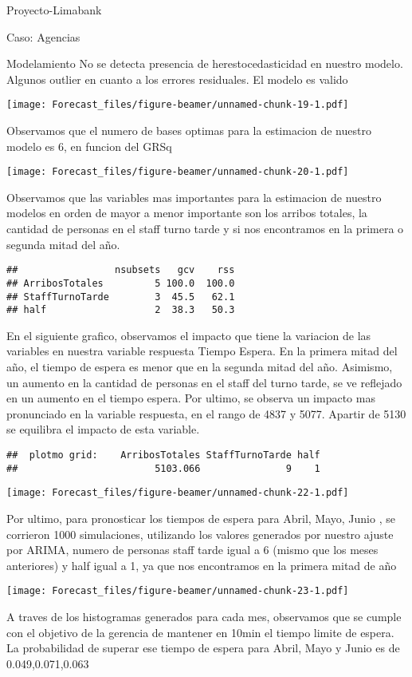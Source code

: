 \documentclass[
  ignorenonframetext,
]{beamer}
\begin{document}
\begin{frame}[fragile]{Proyecto-Limabank}
\begin{block}{Caso: Agencias}
\begin{block}{Modelamiento}
No se detecta presencia de herestocedasticidad en nuestro modelo.
Algunos outlier en cuanto a los errores residuales. El modelo es valido

\texttt{[image: Forecast\_files/figure-beamer/unnamed-chunk-19-1.pdf]}

Observamos que el numero de bases optimas para la estimacion de nuestro
modelo es 6, en funcion del GRSq

\texttt{[image: Forecast\_files/figure-beamer/unnamed-chunk-20-1.pdf]}

Observamos que las variables mas importantes para la estimacion de
nuestro modelos en orden de mayor a menor importante son los arribos
totales, la cantidad de personas en el staff turno tarde y si nos
encontramos en la primera o segunda mitad del año.

\begin{verbatim}
##                 nsubsets   gcv    rss
## ArribosTotales         5 100.0  100.0
## StaffTurnoTarde        3  45.5   62.1
## half                   2  38.3   50.3
\end{verbatim}

En el siguiente grafico, observamos el impacto que tiene la variacion de
las variables en nuestra variable respuesta Tiempo Espera. En la primera
mitad del año, el tiempo de espera es menor que en la segunda mitad del
año. Asimismo, un aumento en la cantidad de personas en el staff del
turno tarde, se ve reflejado en un aumento en el tiempo espera. Por
ultimo, se observa un impacto mas pronunciado en la variable respuesta,
en el rango de 4837 y 5077. Apartir de 5130 se equilibra el impacto de
esta variable.

\begin{verbatim}
##  plotmo grid:    ArribosTotales StaffTurnoTarde half
##                        5103.066               9    1
\end{verbatim}

\texttt{[image: Forecast\_files/figure-beamer/unnamed-chunk-22-1.pdf]}

Por ultimo, para pronosticar los tiempos de espera para Abril, Mayo,
Junio , se corrieron 1000 simulaciones, utilizando los valores generados
por nuestro ajuste por ARIMA, numero de personas staff tarde igual a 6
(mismo que los meses anteriores) y half igual a 1, ya que nos
encontramos en la primera mitad de año

\texttt{[image: Forecast\_files/figure-beamer/unnamed-chunk-23-1.pdf]}

A traves de los histogramas generados para cada mes, observamos que se
cumple con el objetivo de la gerencia de mantener en 10min el tiempo
limite de espera. La probabilidad de superar ese tiempo de espera para
Abril, Mayo y Junio es de 0.049,0.071,0.063

\end{block}

\end{block}

\end{frame}
\end{document}
